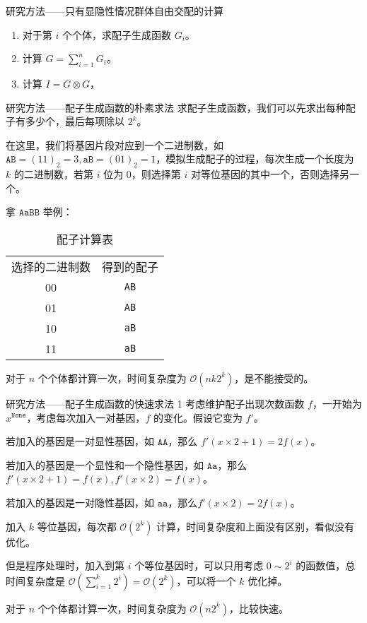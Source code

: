 \documentclass[10pt,aspectratio=43,mathserif]{ctexbeamer}
\begin{document}
	\begin{frame}{研究方法——只有显隐性情况群体自由交配的计算}
		\begin{enumerate}
			\item 对于第 $i$ 个个体，求配子生成函数 $G_i$。
			\item 计算 $G=\sum_{i=1}^n G_i$。 
			\item 计算 $I=G \otimes G$，
		\end{enumerate}
	\end{frame}

	\begin{frame}{研究方法——配子生成函数的朴素求法}
		求配子生成函数，我们可以先求出每种配子有多少个，最后每项除以 $2^k$。 
		
		在这里，我们将基因片段对应到一个二进制数，如 $\texttt{AB}=(11)_2=3,\texttt{aB}=(01)_2=1$，模拟生成配子的过程，每次生成一个长度为 $k$ 的二进制数，若第 $i$ 位为 $0$，则选择第 $i$ 对等位基因的其中一个，否则选择另一个。
		
		拿 $\texttt{AaBB}$ 举例：
		
		\begin{table}[htbp]
			\centering
			\caption{配子计算表}
			\begin{tabular}{|c|c|}
				选择的二进制数 & 得到的配子 \\
				00 & \texttt{AB} \\
				01 & \texttt{AB} \\
				10 & \texttt{aB} \\
				11 & \texttt{aB} \\
			\end{tabular}
		\end{table}
		
		对于 $n$ 个个体都计算一次，时间复杂度为 $\mathcal O(nk 2^k)$，是不能接受的。
	\end{frame}

	\begin{frame}{研究方法——配子生成函数的快速求法 1}
		考虑维护配子出现次数函数 $f$，一开始为 $x^{\texttt{None}}$，考虑每次加入一对基因，$f$ 的变化。假设它变为 $f'$。
		
		若加入的基因是一对显性基因，如 $\texttt{AA}$，那么 $f'(x \times 2 + 1)=2f(x)$。
		
		若加入的基因是一个显性和一个隐性基因，如 $\texttt{Aa}$，那么 $f'(x \times 2 + 1)=f(x),f'(x \times 2)=f(x)$。
		
		若加入的基因是一对隐性基因，如 $\texttt{aa}$，那么$f'(x \times 2)=2f(x)$。
		
		加入 $k$ 等位基因，每次都 $\mathcal O(2^k)$ 计算，时间复杂度和上面没有区别，看似没有优化。
		
		但是程序处理时，加入到第 $i$ 个等位基因时，可以只用考虑 $0 \sim 2^i$ 的函数值，总时间复杂度是 $\mathcal O(\sum_{i=1}^k 2^i)=\mathcal O(2^k)$，可以将一个 $k$ 优化掉。
		
		对于 $n$ 个个体都计算一次，时间复杂度为 $\mathcal O(n2^k)$，比较快速。
	\end{frame}
\end{document}
